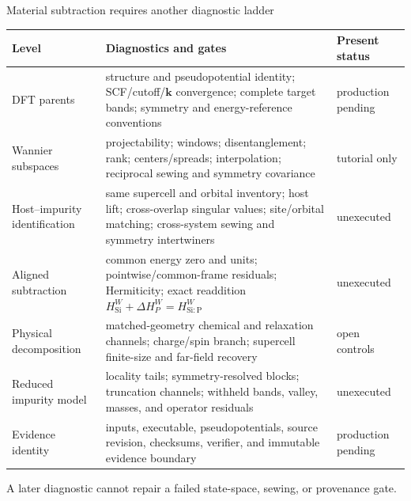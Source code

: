 \documentclass[aspectratio=169,10pt]{beamer}
\newcommand{\future}[1]{\textcolor{prospectivered}{#1}}
\begin{document}
\begin{frame}{Material subtraction requires another diagnostic ladder}
  \scriptsize
  \begin{tabular}{p{}p{}p{}}
    \toprule
    Level & Diagnostics and gates & Present status\\
    \midrule
    DFT parents
      & structure and pseudopotential identity; SCF/cutoff/$\mathbf k$ convergence;
        complete target bands; symmetry and energy-reference conventions
      & \future{production pending}\\[0.35em]
    Wannier subspaces
      & projectability; windows; disentanglement; rank; centers/spreads; interpolation;
        reciprocal sewing and symmetry covariance
      & tutorial only\\[0.35em]
    Host--impurity identification
      & same supercell and orbital inventory; host lift; cross-overlap singular values;
        site/orbital matching; cross-system sewing and symmetry intertwiners
      & \future{unexecuted}\\[0.35em]
    Aligned subtraction
      & common energy zero and units; pointwise/common-frame residuals; Hermiticity;
        exact readdition $H_{\mathrm{Si}}^W+\Delta H_P^W=H_{\mathrm{Si:P}}^W$
      & \future{unexecuted}\\[0.35em]
    Physical decomposition
      & matched-geometry chemical and relaxation channels; charge/spin branch;
        supercell finite-size and far-field recovery
      & \future{open controls}\\[0.35em]
    Reduced impurity model
      & locality tails; symmetry-resolved blocks; truncation channels; withheld bands,
        valley, masses, and operator residuals
      & \future{unexecuted}\\[0.35em]
    Evidence identity
      & inputs, executable, pseudopotentials, source revision, checksums, verifier, and
        immutable evidence boundary
      & \future{production pending}\\
    \bottomrule
  \end{tabular}

  \centering
  A later diagnostic cannot repair a failed state-space, sewing, or provenance gate.
\end{frame}
\end{document}
